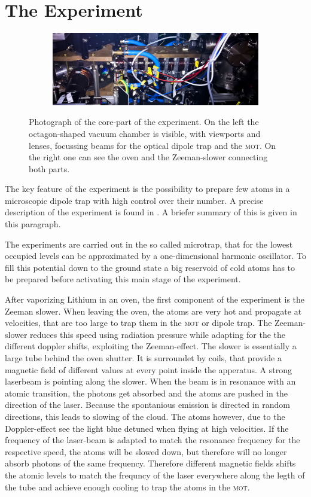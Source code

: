 \chapter{The Experiment}

\begin{figure}[h]
\centering
\begin{subfigure}[b]{0.8\textwidth}
                \includegraphics[width=\textwidth]{experiment}
\end{subfigure}
\caption{Photograph of the core-part of the experiment. On the left the octagon-shaped vacuum chamber is visible, with viewports and lenses, focussing beams for the optical dipole trap and the \textsc{mot}. On the right one can see the oven and the Zeeman-slower connecting both parts.}
\label{experiment}
\end{figure}
The key feature of the experiment is the possibility to prepare few atoms in a microscopic dipole trap with high control over their number. A precise description of the experiment is found in \cite{friedhelm}. A briefer summary of this is given in this paragraph.

The experiments are carried out in the so called microtrap, that for the lowest occupied levels can be approximated by a one-dimensional harmonic oscillator. To fill this potential down to the ground state a big reservoid of cold atoms has to be prepared before activating this main stage of the experiment.

After vaporizing Lithium in an oven, the first component of the experiment is the Zeeman slower. When leaving the oven, the atoms are very hot and propagate at velocities, that are too large to trap them in the \textsc{mot} or dipole trap. The Zeeman-slower reduces this speed using radiation pressure while adapting for the the different doppler shifts, exploiting the Zeeman-effect. The slower is essentially a large tube behind the oven shutter. It is surroundet by coils, that provide a magnetic field of different values at every point inside the apperatus. A strong laserbeam is pointing along the slower. When the beam is in resonance with an atomic transition, the photons get absorbed and the atoms are pushed in the direction of the laser. Because the spontanious emission is directed in random directions, this leads to slowing of the cloud. The atoms however, due to the Doppler-effect see the light blue detuned when flying at high velocities. If the frequency of the laser-beam is adapted to match the resonance frequency for the respective speed, the atoms will be slowed down, but therefore will no longer absorb photons of the same frequency. Therefore different magnetic fields shifts the atomic levels to match the frequncy of the laser everywhere along the legth of the tube and achieve enough cooling to trap the atoms in the \textsc{mot}. 

